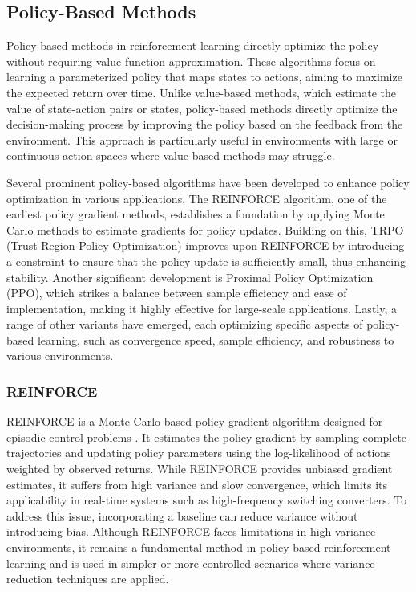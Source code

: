 \subsection{Policy-Based Methods}
\label{sec:pol_methods}

Policy-based methods in reinforcement learning directly optimize the policy without requiring value function approximation. These algorithms focus on learning a parameterized policy that maps states to actions, aiming to maximize the expected return over time. Unlike value-based methods, which estimate the value of state-action pairs or states, policy-based methods directly optimize the decision-making process by improving the policy based on the feedback from the environment. This approach is particularly useful in environments with large or continuous action spaces where value-based methods may struggle.

Several prominent policy-based algorithms have been developed to enhance policy optimization in various applications. The REINFORCE algorithm, one of the earliest policy gradient methods, establishes a foundation by applying Monte Carlo methods to estimate gradients for policy updates. Building on this, TRPO (Trust Region Policy Optimization) improves upon REINFORCE by introducing a constraint to ensure that the policy update is sufficiently small, thus enhancing stability. Another significant development is Proximal Policy Optimization (PPO), which strikes a balance between sample efficiency and ease of implementation, making it highly effective for large-scale applications. Lastly, a range of other variants have emerged, each optimizing specific aspects of policy-based learning, such as convergence speed, sample efficiency, and robustness to various environments.

\subsubsection{REINFORCE}

REINFORCE is a Monte Carlo-based policy gradient algorithm designed for episodic control problems \cite{williams1992simple}. It estimates the policy gradient by sampling complete trajectories and updating policy parameters using the log-likelihood of actions weighted by observed returns. While REINFORCE provides unbiased gradient estimates, it suffers from high variance and slow convergence, which limits its applicability in real-time systems such as high-frequency switching converters. To address this issue, incorporating a baseline can reduce variance without introducing bias. Although REINFORCE faces limitations in high-variance environments, it remains a fundamental method in policy-based reinforcement learning and is used in simpler or more controlled scenarios where variance reduction techniques are applied. 

